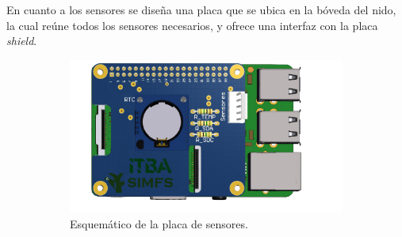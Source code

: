 En cuanto a los sensores se diseña una placa que se ubica en la bóveda del nido, la cual reúne todos los sensores necesarios, y ofrece una interfaz con la placa \textit{shield}.
\begin{figure}[H]
    \centering
    \begin{subfigure}{0.5\textwidth}
		\centering
		\includegraphics[width=\linewidth,page=2]{ImagenesConstruccion del prototipo/shieldSensor}		
		\caption{Esquemático de la placa de sensores.}
		\label{fig:sens}
	\end{subfigure}
    \caption*{}
\end{figure}

